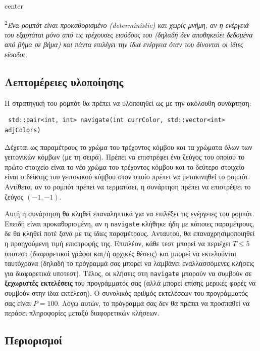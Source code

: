 \documentclass[12pt]{article}
\begin{document}
\begin{adjustbox}{center}
	
\end{adjustbox}

\textsuperscript{2}\textit{Ένα ρομπότ είναι προκαθορισμένο (deterministic) και χωρίς μνήμη, αν η ενέργειά του εξαρτάται μόνο από τις τρέχουσες εισόδους του (δηλαδή δεν αποθηκεύει δεδομένα από βήμα σε βήμα) και πάντα επιλέγει την ίδια ενέργεια όταν του δίνονται οι ίδιες είσοδοι.}

\subsection{Λεπτομέρειες υλοποίησης}
Η στρατηγική του ρομπότ θα πρέπει να υλοποιηθεί ως με την ακόλουθη συνάρτηση:
\begin{lstlisting}
 std::pair<int, int> navigate(int currColor, std::vector<int> adjColors)
\end{lstlisting}

Δέχεται ως παραμέτρους το χρώμα του τρέχοντος κόμβου και τα χρώματα όλων των γειτονικών κόμβων (με τη σειρά). Πρέπει να επιστρέφει ένα ζεύγος του οποίου το πρώτο στοιχείο είναι το νέο χρώμα του τρέχοντος κόμβου και το δεύτερο στοιχείο είναι ο δείκτης του γειτονικού κόμβου στον οποίο πρέπει να μετακινηθεί το ρομπότ. Αντίθετα, αν το ρομπότ πρέπει να τερματίσει, η συνάρτηση πρέπει να επιστρέψει το ζεύγος $(-1, -1)$.

Αυτή η συνάρτηση θα κληθεί επαναληπτικά για να επιλέξει τις ενέργειες του ρομπότ. Επειδή είναι προκαθορισμένη, αν η \texttt{navigate} κλήθηκε ήδη με κάποιες παραμέτρους, δε θα κληθεί ποτέ ξανά με τις ίδιες παραμέτρους. Αντ\textquotesingle αυτού, θα επαναχρησιμοποιηθεί η προηγούμενη τιμή επιστροφής της. Επιπλέον, κάθε τεστ μπορεί να περιέχει $T \leq 5$ υποτεστ (διαφορετικοί γράφοι και/ή αρχικές θέσεις) και μπορεί να εκτελούνται ταυτόχρονα (δηλαδή το πρόγραμμά σας μπορεί να λαμβάνει εναλλασσόμενες κλήσεις για διαφορετικά υποτεστ). Τέλος, οι κλήσεις στη \texttt{navigate} μπορούν να συμβούν σε \textbf{ξεχωριστές εκτελέσεις} του προγράμματός σας (αλλά μπορεί επίσης μερικές φορές να συμβούν στην ίδια εκτέλεση). Ο συνολικός αριθμός εκτελέσεων του προγράμματός σας είναι $P = 100$. Λόγω αυτών, το πρόγραμμά σας δεν θα πρέπει να προσπαθεί να περάσει πληροφορίες μεταξύ διαφορετικών κλήσεων. 

\subsection{Περιορισμοί}
\end{document}
